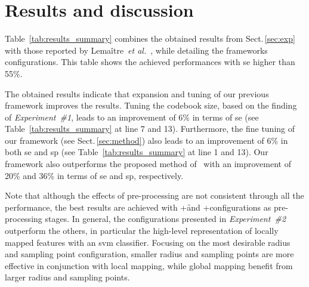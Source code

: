 
\section{Results and discussion}
\label{sec:res-dis}

Table~\ref{tab:results_summary} combines the obtained results from Sect.\,\ref{sec:exp} with those reported by Lema\^{i}tre~\emph{et al.}~\cite{Lemaintre2015miccaiOCT}, while detailing the frameworks configurations.
This table shows the achieved performances with \ac{se} higher than 55\%.

The obtained results indicate that expansion and tuning of our previous framework improves the results.
Tuning the codebook size, based on the finding of \emph{Experiment~\#1}, leads to an improvement of 6\% in terms of \ac{se} (see Table~\ref{tab:results_summary} at line 7 and 13).
Furthermore, the fine tuning of our framework (see Sect.\,\ref{sec:method}) also leads to an improvement of 6\% in both \ac{se} and \ac{sp} (see Table~\ref{tab:results_summary} at line 1 and 13).
Our framework also outperforms the proposed method of~\cite{Venhuizen2015} with an improvement of 20\% and 36\% in terms of \ac{se} and \ac{sp}, respectively.

Note that although the effects of pre-processing are not consistent through all the performance, the best results are achieved with \nlm+\f and \nlm+\fal configurations as pre-processing stages.
In general, the configurations presented in \emph{Experiment~\#2} outperform the others, in particular the high-level representation of locally mapped features with an \ac{svm} classifier.  
Focusing on the most desirable radius and sampling point configuration, smaller radius and sampling points are more effective in conjunction with local mapping, while global mapping benefit from larger radius and sampling points.

